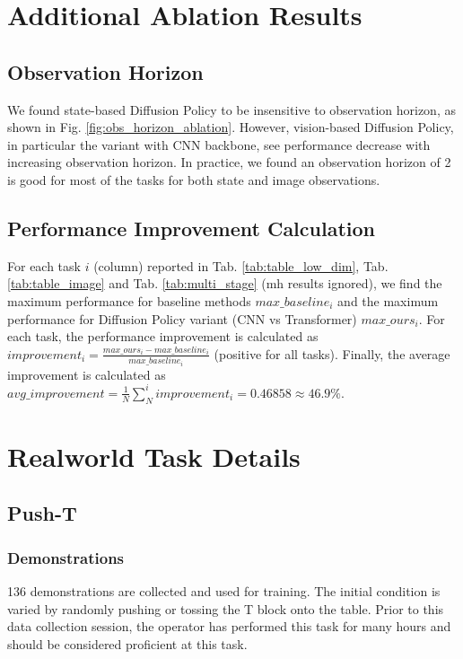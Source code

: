 \section{Additional Ablation Results}
\subsection{Observation Horizon}
We found state-based Diffusion Policy to be insensitive to observation horizon, as shown in Fig. \ref{fig:obs_horizon_ablation}. However, vision-based Diffusion Policy, in particular the variant with CNN backbone, see performance decrease with increasing observation horizon. In practice, we found an observation horizon of 2 is good for most of the tasks for both state and image observations.

\subsection{Performance Improvement Calculation}
For each task $i$ (column) reported in Tab. \ref{tab:table_low_dim}, Tab. \ref{tab:table_image} and Tab. \ref{tab:multi_stage} (mh results ignored), we find the maximum performance for baseline methods $max\_baseline_i$ and the maximum performance for Diffusion Policy variant (CNN vs Transformer) $max\_ours_i$. For each task, the performance improvement is calculated as $improvement_i = \frac{max\_ours_i-max\_baseline_i}{max\_baseline_i}$ (positive for all tasks). Finally, the average improvement is calculated as $avg\_improvement=\frac{1}{N}\sum^i_N improvement_i=0.46858 \approx 46.9\%$.



\section{Realworld Task Details}

\subsection{Push-T}
\subsubsection{Demonstrations}
136 demonstrations are collected and used for training. The initial condition is varied by randomly pushing or tossing the T block onto the table. Prior to this data collection session, the operator has performed this task for many hours and should be considered proficient at this task.

